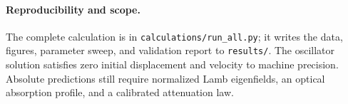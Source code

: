 \paragraph{Reproducibility and scope.}
The complete calculation is in \texttt{calculations/run\_all.py}; it writes the
data, figures, parameter sweep, and validation report to \texttt{results/}. The
oscillator solution satisfies zero initial displacement and velocity to machine
precision. Absolute predictions still require normalized Lamb eigenfields, an
optical absorption profile, and a calibrated attenuation law.

